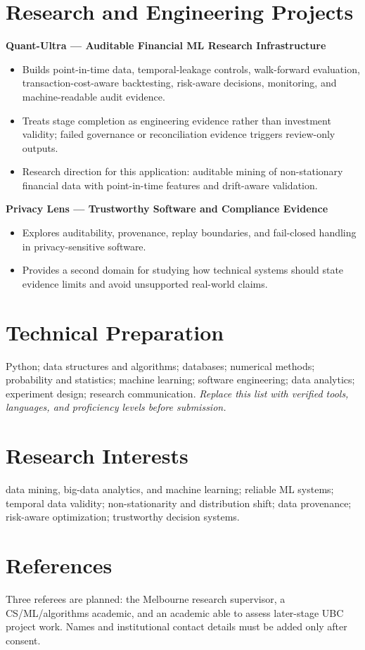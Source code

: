 \documentclass[11pt]{article}
\begin{document}
\section*{Research and Engineering Projects}
\textbf{Quant-Ultra --- Auditable Financial ML Research Infrastructure}
\begin{itemize}
\item Builds point-in-time data, temporal-leakage controls, walk-forward evaluation, transaction-cost-aware backtesting, risk-aware decisions, monitoring, and machine-readable audit evidence.
\item Treats stage completion as engineering evidence rather than investment validity; failed governance or reconciliation evidence triggers review-only outputs.
\item Research direction for this application: auditable mining of non-stationary financial data with point-in-time features and drift-aware validation.
\end{itemize}

\textbf{Privacy Lens --- Trustworthy Software and Compliance Evidence}
\begin{itemize}
\item Explores auditability, provenance, replay boundaries, and fail-closed handling in privacy-sensitive software.
\item Provides a second domain for studying how technical systems should state evidence limits and avoid unsupported real-world claims.
\end{itemize}

\section*{Technical Preparation}
Python; data structures and algorithms; databases; numerical methods; probability and statistics; machine learning; software engineering; data analytics; experiment design; research communication. \textit{Replace this list with verified tools, languages, and proficiency levels before submission.}

\section*{Research Interests}
data mining, big-data analytics, and machine learning; reliable ML systems; temporal data validity; non-stationarity and distribution shift; data provenance; risk-aware optimization; trustworthy decision systems.

\section*{References}
Three referees are planned: the Melbourne research supervisor, a CS/ML/algorithms academic, and an academic able to assess later-stage UBC project work. Names and institutional contact details must be added only after consent.
\end{document}
